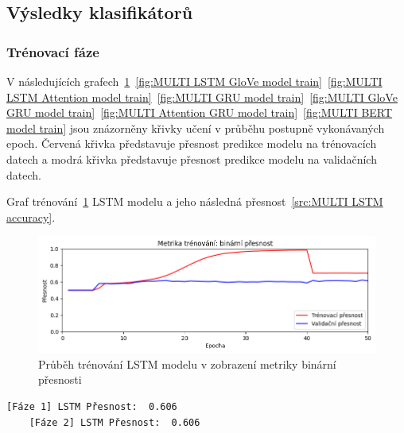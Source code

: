 \subsection{Výsledky klasifikátorů}
\subsubsection{Trénovací fáze}
V následujících grafech~\ref{fig:MULTI LSTM model train}~\ref{fig:MULTI LSTM GloVe model train}~\ref{fig:MULTI LSTM Attention model train}~\ref{fig:MULTI GRU model train}~\ref{fig:MULTI GloVe GRU model train}~\ref{fig:MULTI Attention GRU model train}~\ref{fig:MULTI BERT model train} jsou znázorněny křivky učení v průběhu postupně vykonávaných epoch.
Červená křivka představuje přesnost predikce modelu na trénovacích datech a modrá křivka představuje přesnost predikce modelu na validačních datech.

Graf trénování~\ref{fig:MULTI LSTM model train} LSTM modelu a jeho následná přesnost~\ref{src:MULTI LSTM accuracy}.
\begin{figure}[H]
	\centering
	\includegraphics[width=1\textwidth]{Figures/MULTI_LSTM_binarni_presnost.png}
	\caption{Průběh trénování LSTM modelu v zobrazení metriky binární přesnosti}\label{fig:MULTI LSTM model train}
\end{figure}
\begin{lstlisting}[label=src:MULTI LSTM accuracy, caption={Výsledek LSTM modelu na více jazyčném datasetu po trénování~\ref{fig:MULTI LSTM model train}}]
	[Fáze 1] LSTM Přesnost:  0.606
	[Fáze 2] LSTM Přesnost:  0.606
\end{lstlisting}

